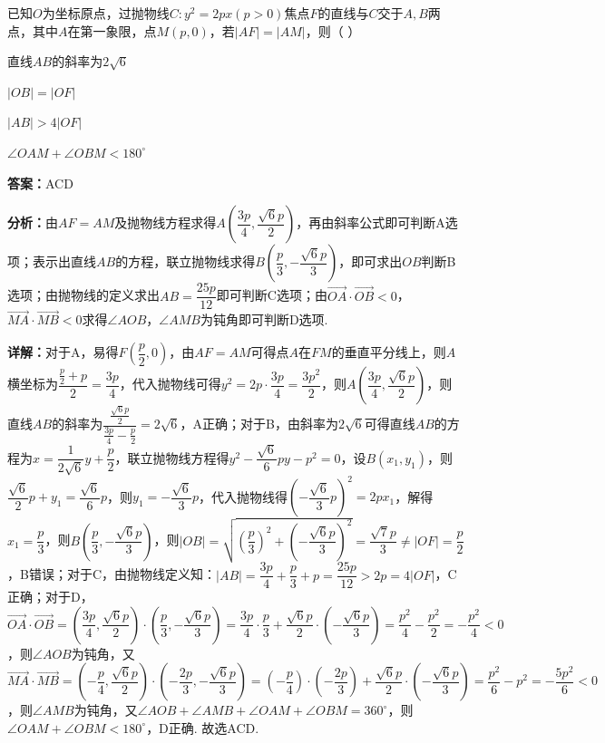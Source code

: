 \begin{question}[points=5]
已知$O$为坐标原点，过抛物线$C:y^2=2px(p>0)$焦点$F$的直线与$C$交于$A,B$两点，其中$A$在第一象限，点$M(p,0)$，若$|AF|=|AM|$，则（ ）
\begin{choices}
  \item 直线$AB$的斜率为$2\sqrt{6}$
  \item $|OB|=|OF|$
  \item $|AB|>4|OF|$
  \item $\angle OAM+\angle OBM<180^\circ$
\end{choices}
\begin{solution}
\textbf{答案：}ACD

\textbf{分析：}由$AF=AM$及抛物线方程求得$A\left(\dfrac{3p}{4},\dfrac{\sqrt{6}p}{2}\right)$，再由斜率公式即可判断A选项；表示出直线$AB$的方程，联立抛物线求得$B\left(\dfrac{p}{3},-\dfrac{\sqrt{6}p}{3}\right)$，即可求出$OB$判断B选项；由抛物线的定义求出$AB=\dfrac{25p}{12}$即可判断C选项；由$\overrightarrow{OA}\cdot\overrightarrow{OB}<0$，$\overrightarrow{MA}\cdot\overrightarrow{MB}<0$求得$\angle AOB$，$\angle AMB$为钝角即可判断D选项.

\textbf{详解：}对于A，易得$F\left(\dfrac{p}{2},0\right)$，由$AF=AM$可得点$A$在$FM$的垂直平分线上，则$A$横坐标为$\dfrac{\frac{p}{2}+p}{2}=\dfrac{3p}{4}$，代入抛物线可得$y^2=2p\cdot\dfrac{3p}{4}=\dfrac{3p^2}{2}$，则$A\left(\dfrac{3p}{4},\dfrac{\sqrt{6}p}{2}\right)$，则直线$AB$的斜率为$\dfrac{\frac{\sqrt{6}p}{2}}{\frac{3p}{4}-\frac{p}{2}}=2\sqrt{6}$，A正确；对于B，由斜率为$2\sqrt{6}$可得直线$AB$的方程为$x=\dfrac{1}{2\sqrt{6}}y+\dfrac{p}{2}$，联立抛物线方程得$y^2-\dfrac{\sqrt{6}}{6}py-p^2=0$，设$B(x_1,y_1)$，则$\dfrac{\sqrt{6}}{2}p+y_1=\dfrac{\sqrt{6}}{6}p$，则$y_1=-\dfrac{\sqrt{6}}{3}p$，代入抛物线得$\left(-\dfrac{\sqrt{6}}{3}p\right)^2=2px_1$，解得$x_1=\dfrac{p}{3}$，则$B\left(\dfrac{p}{3},-\dfrac{\sqrt{6}p}{3}\right)$，则$|OB|=\sqrt{\left(\dfrac{p}{3}\right)^2+\left(-\dfrac{\sqrt{6}p}{3}\right)^2}=\dfrac{\sqrt{7}p}{3}\neq|OF|=\dfrac{p}{2}$，B错误；对于C，由抛物线定义知：$|AB|=\dfrac{3p}{4}+\dfrac{p}{3}+p=\dfrac{25p}{12}>2p=4|OF|$，C正确；对于D，$\overrightarrow{OA}\cdot\overrightarrow{OB}=\left(\dfrac{3p}{4},\dfrac{\sqrt{6}p}{2}\right)\cdot\left(\dfrac{p}{3},-\dfrac{\sqrt{6}p}{3}\right)=\dfrac{3p}{4}\cdot\dfrac{p}{3}+\dfrac{\sqrt{6}p}{2}\cdot\left(-\dfrac{\sqrt{6}p}{3}\right)=\dfrac{p^2}{4}-\dfrac{p^2}{2}=-\dfrac{p^2}{4}<0$，则$\angle AOB$为钝角，又$\overrightarrow{MA}\cdot\overrightarrow{MB}=\left(-\dfrac{p}{4},\dfrac{\sqrt{6}p}{2}\right)\cdot\left(-\dfrac{2p}{3},-\dfrac{\sqrt{6}p}{3}\right)=\left(-\dfrac{p}{4}\right)\cdot\left(-\dfrac{2p}{3}\right)+\dfrac{\sqrt{6}p}{2}\cdot\left(-\dfrac{\sqrt{6}p}{3}\right)=\dfrac{p^2}{6}-p^2=-\dfrac{5p^2}{6}<0$，则$\angle AMB$为钝角，又$\angle AOB+\angle AMB+\angle OAM+\angle OBM=360^\circ$，则$\angle OAM+\angle OBM<180^\circ$，D正确. 故选ACD.
\end{solution}
\end{question}


